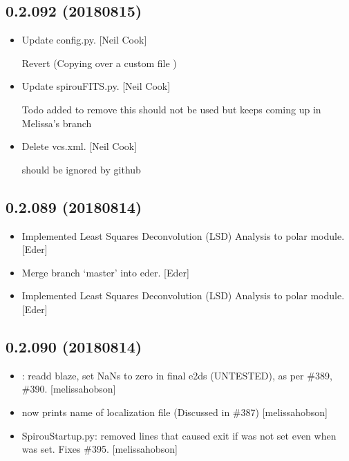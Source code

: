 \documentclass[a4paper,10pt,english]{report}
\begin{document}
\subsection{0.2.092 (2018\sphinxhyphen{}08\sphinxhyphen{}15)}
\label{\detokenize{misc/changelog:id388}}\begin{itemize}
\item {} 
Update config.py. {[}Neil Cook{]}

Revert  (Copying over a custom  file )

\item {} 
Update spirouFITS.py. {[}Neil Cook{]}

Todo added to remove  this should not be used \sphinxhyphen{} but keeps coming up in Melissa’s branch

\item {} 
Delete vcs.xml. {[}Neil Cook{]}

should be ignored by github

\end{itemize}


\subsection{0.2.089 (2018\sphinxhyphen{}08\sphinxhyphen{}14)}
\label{\detokenize{misc/changelog:id389}}\begin{itemize}
\item {} 
Implemented Least Squares Deconvolution (LSD) Analysis to polar
module. {[}Eder{]}

\item {} 
Merge branch ‘master’ into eder. {[}Eder{]}

\item {} 
Implemented Least Squares Deconvolution (LSD) Analysis to polar
module. {[}Eder{]}

\end{itemize}


\subsection{0.2.090 (2018\sphinxhyphen{}08\sphinxhyphen{}14)}
\label{\detokenize{misc/changelog:id390}}\begin{itemize}
\item {} 
: re\sphinxhyphen{}add blaze, set NaNs to zero in final e2ds
(UNTESTED), as per \#389, \#390. {[}melissa\sphinxhyphen{}hobson{]}

\item {} 
 now prints name of localization file (Discussed in
\#387) {[}melissa\sphinxhyphen{}hobson{]}

\item {} 
SpirouStartup.py: removed lines that caused exit if  was not
set even when  was set. Fixes \#395. {[}melissa\sphinxhyphen{}hobson{]}

\end{itemize}
\end{document}

